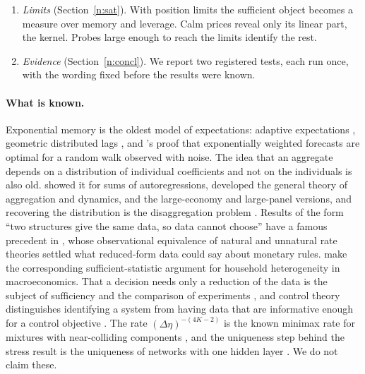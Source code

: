 \begin{enumerate}[label=(\arabic*),leftmargin=*,itemsep=2pt]
\item \emph{Limits} (Section~\ref{n:sat}). With position limits the sufficient object becomes a measure over memory and leverage. Calm prices reveal only its linear part, the kernel. Probes large enough to reach the limits identify the rest.
\item \emph{Evidence} (Section~\ref{n:concl}). We report two registered tests, each run once, with the wording fixed before the results were known.
\end{enumerate}

\paragraph{What is known.} Exponential memory is the oldest model of expectations: adaptive expectations \citep{cagan1956,nerlove1958}, geometric distributed lags \citep{koyck1954}, and \citet{muth1960}'s proof that exponentially weighted forecasts are optimal for a random walk observed with noise. The idea that an aggregate depends on a distribution of individual coefficients and not on the individuals is also old. \citet{granger1980} showed it for sums of autoregressions, \citet{forni1997} developed the general theory of aggregation and dynamics, \citet{zaffaroni2004} and \citet{pesaran2014} the large-economy and large-panel versions, and recovering the distribution is the disaggregation problem \citep{celov2008}. Results of the form ``two structures give the same data, so data cannot choose'' have a famous precedent in \citet{sargent1976}, whose observational equivalence of natural and unnatural rate theories settled what reduced-form data could say about monetary rules. \citet{auclert2024} make the corresponding sufficient-statistic argument for household heterogeneity in macroeconomics. That a decision needs only a reduction of the data is the subject of sufficiency and the comparison of experiments \citep{blackwell1953,lecam1964}, and control theory distinguishes identifying a system from having data that are informative enough for a control objective \citep{vanwaarde2020}. The rate $(\Delta\eta)^{-(4K-2)}$ is the known minimax rate for mixtures with near-colliding components \citep{heinrich2018,wu2020}, and the uniqueness step behind the stress result is the uniqueness of networks with one hidden layer \citep{sussmann1992}. We do not claim these.

